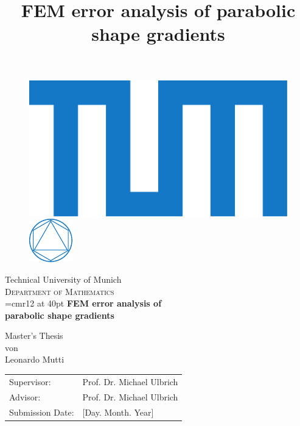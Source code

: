 \documentclass[english,a4paper,9pt,oneside]{scrbook}	%
\theoremstyle{break}
\theoremstyle{remark}
\begin{document}
\pagestyle{empty}       %


\vspace*{3cm}
\begin{figure}[H]
\centering
\includegraphics[height=0.075\columnwidth]{Logos/blau/2015_Logo_TUM_CMYK.pdf}
\hspace{90pt}
\includegraphics[height=0.075\columnwidth]{Logos/08_Mathematik/MA_blau/FAK_MA_CMYK.pdf}
\end{figure}
\vspace*{1.5cm}
\begin{center}
{\Huge Technical University of Munich}
\\
\vspace*{1.5cm}
{\huge \textsc{Department of Mathematics}}
\\
\vspace*{3cm}
\font\myfont=cmr12 at 40pt
{\Huge \textbf{FEM error analysis of\\parabolic shape gradients\\}}
\title{FEM error analysis of parabolic shape gradients}
\vspace*{3cm}
{\Large Master's Thesis}\linebreak \\
{\Large von}\linebreak \\
{\Large Leonardo Mutti}\\
\vspace*{3cm}
{\Large 
\begin{tabular}{ll}
Supervisor: & Prof. Dr. Michael Ulbrich\\
Advisor: & Prof. Dr. Michael Ulbrich\\
Submission Date: & [Day. Month. Year]
\end{tabular}
}
\end{center}

\newpage    %
\pagestyle{plain}
\end{document}
